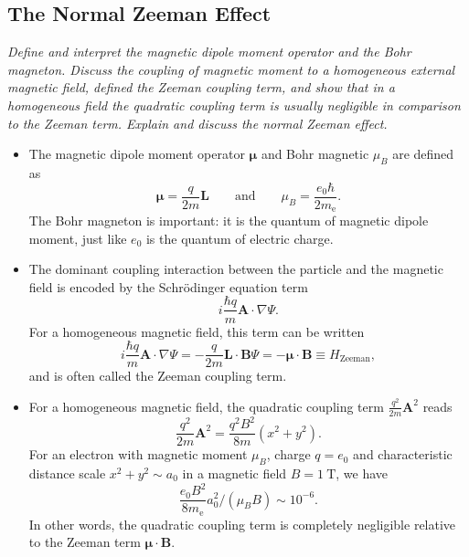 \documentclass[11pt, a4paper]{article}
\renewcommand{\grad}{\nabla}
\newcommand{\eqtext}[1]{\qquad \text{#1} \qquad}
\newcommand{\Schro}{Schr\"{o}dinger\xspace}
\renewcommand{\vec}[1]{\bm{#1}}  %
\renewcommand{\L}{\vec{L}}  %
\newcommand{\A}{\vec{A}}  %
\newcommand{\B}{\vec{B}}  %
\newcommand{\m}{\vec{\mu}}  %
\renewcommand{\P}{\Psi}  %
\begin{document}
\subsection{The Normal Zeeman Effect} \label{ss:zeeman}
\textit{Define and interpret the magnetic dipole moment operator and the Bohr magneton. Discuss the coupling of magnetic moment to a homogeneous external magnetic field, defined the Zeeman coupling term, and show that in a homogeneous field the quadratic coupling term is usually negligible in comparison to the Zeeman term. Explain and discuss the normal Zeeman effect.}

\begin{itemize}

	\item The magnetic dipole moment operator $ \m $ and Bohr magnetic $ \mu_{B} $ are defined as
	\begin{equation*}
		\m = \frac{q}{2m}\L \eqtext{and} \mu_{B} = \frac{e_{0}\hbar}{2m_{\text{e}}}.
	\end{equation*}
	The Bohr magneton is important: it is the quantum of magnetic dipole moment, just like $ e_{0} $ is the quantum of electric charge.


    \item The dominant coupling interaction between the particle and the magnetic field is encoded by the \Schro equation term
    \begin{equation*}
        i \frac{\hbar q}{m} \A \cdot \grad \P.
    \end{equation*}
    For a homogeneous magnetic field, this term can be written
    \begin{equation*}
        i \frac{\hbar q}{m} \A \cdot \grad \P = - \frac{q}{2m}\L \cdot \B \P = - \m \cdot \B \equiv H_{\text{Zeeman}},
    \end{equation*}
    and is often called the Zeeman coupling term.
    
	\item For a homogeneous magnetic field, the quadratic coupling term $ \frac{q^{2}}{2m}\A^{2} $ reads
    \begin{equation*}
        \frac{q^{2}}{2m}\A^{2} = \frac{q^{2}B^{2}}{8 m}(x^{2} + y^{2}).
    \end{equation*}
	For an electron with magnetic moment $ \mu_{B}$, charge $ q = e_{0} $ and characteristic distance scale $ x^{2} + y^{2} \sim a_{0} $ in a magnetic field $ B = \SI{1}{\tesla} $, we have
	\begin{equation*}
		\frac{e_{0}B^{2}}{8m_{\text{e}}}a_{0}^{2} \Big / (\mu_{B}B) \sim 10^{-6}.
	\end{equation*}
	In other words, the quadratic coupling term is completely negligible relative to the Zeeman term $ \m \cdot \B $. 


\end{itemize}
\end{document}

